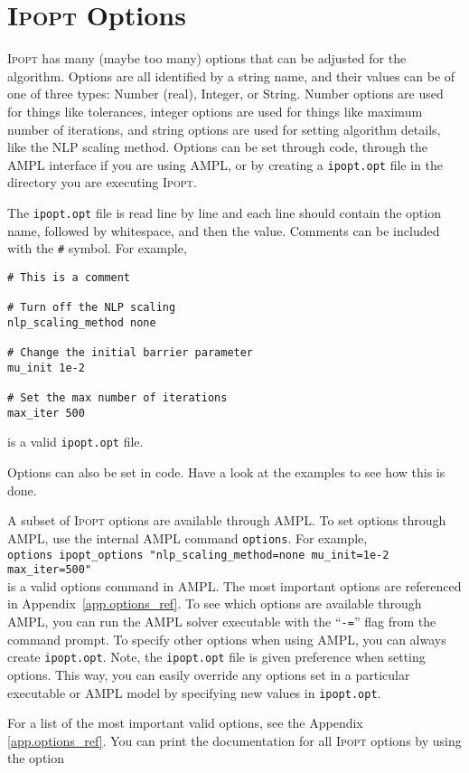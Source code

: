 \documentclass[10pt]{article}
\newcommand{\Ipopt}{\textsc{Ipopt}\xspace}
\begin{document}
\section{\Ipopt Options}\label{sec:options}
\Ipopt has many (maybe too many) options that can be adjusted for the
algorithm.  Options are all identified by a string name, and their
values can be of one of three types: Number (real), Integer, or
String. Number options are used for things like tolerances, integer
options are used for things like maximum number of iterations, and
string options are used for setting algorithm details, like the NLP
scaling method. Options can be set through code, through the AMPL
interface if you are using AMPL, or by creating a {\tt ipopt.opt}
file in the directory you are executing \Ipopt.

The {\tt ipopt.opt} file is read line by line and each line should
contain the option name, followed by whitespace, and then the
value. Comments can be included with the {\tt \#} symbol. For example,
\begin{verbatim}
# This is a comment

# Turn off the NLP scaling
nlp_scaling_method none

# Change the initial barrier parameter
mu_init 1e-2

# Set the max number of iterations
max_iter 500
\end{verbatim}
is a valid {\tt ipopt.opt} file.

Options can also be set in code. Have a look at the examples to see
how this is done. 

A subset of \Ipopt options are available through AMPL. To set options
through AMPL, use the internal AMPL command {\tt options}.  For
example, \\
{\tt options ipopt\_options "nlp\_scaling\_method=none mu\_init=1e-2
  max\_iter=500"} \\
is a valid options command in AMPL. The most important options are
referenced in Appendix~\ref{app.options_ref}. To see which options are
available through AMPL, you can run the AMPL solver executable with
the ``{\tt -=}'' flag from the command prompt.  To specify other
options when using AMPL, you can always create {\tt ipopt.opt}.  Note,
the {\tt ipopt.opt} file is given preference when setting options.
This way, you can easily override any options set in a particular
executable or AMPL model by specifying new values in {\tt ipopt.opt}.

For a list of the most important valid options, see the Appendix
\ref{app.options_ref}. You can print the documentation for all \Ipopt
options by using the option
\medskip
\end{document}
